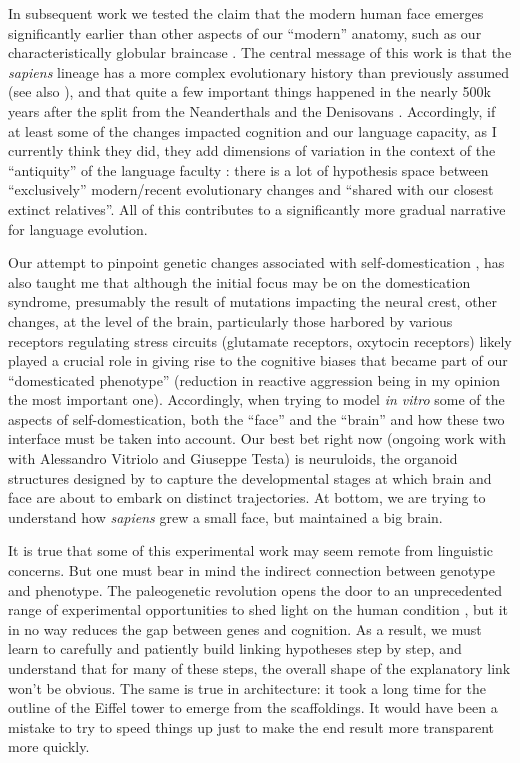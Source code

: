 In subsequent work \citep{andirko2021fine} we tested the claim that the modern human face emerges significantly earlier than other aspects of our ``modern'' anatomy, such as our characteristically globular braincase \citep{hublin2017new}. The central message of this work is that the \textit{sapiens} lineage has a more complex evolutionary history than previously assumed (see also \cite{scerri2018did,Bergstrom}), and that quite a few important things happened in the nearly 500k years after the split from the Neanderthals and the Denisovans \citep{stringer2016origin}. Accordingly, if at least some of the changes impacted cognition and our language capacity, as I currently think they did, they add dimensions of variation in the context of the ``antiquity'' of the language faculty \citep{dediu2013antiquity}: there is a lot of hypothesis space between ``exclusively'' modern/recent evolutionary changes and ``shared with our closest extinct relatives''. All of this contributes to a significantly more gradual narrative for language evolution.

Our attempt to pinpoint genetic changes associated with self-domestication \citep{theofanopoulou2017self}, has also taught me that although the initial focus may be on the domestication syndrome,
presumably the result of mutations impacting the neural crest, other changes, at the level of the brain, particularly those harbored by various receptors regulating stress circuits (glutamate receptors, oxytocin receptors) likely played a crucial role \citep{o2020glutamate,theofanopoulou2017hypothesis} in giving rise to the cognitive biases that became part of our ``domesticated phenotype'' (reduction in reactive aggression being in my opinion the most important one). Accordingly, when trying to model \textit{in vitro} some of the aspects of self-domestication, both the ``face'' and the ``brain'' and how these two interface must be taken into account. Our best bet right now (ongoing work with with Alessandro Vitriolo and Giuseppe Testa) is neuruloids, the organoid structures designed by \cite{haremaki2019self} to capture the developmental stages at which brain and face are about to embark on distinct trajectories. At bottom, we are trying to understand how \textit{sapiens} grew a small face, but maintained a big brain.

It is true that some of this experimental work may seem remote from linguistic concerns. But one must bear in mind the indirect connection between genotype and phenotype. The paleogenetic revolution opens the door to an unprecedented range of experimental opportunities to shed light on the human condition \citep{paabo2014human}, but it in no way reduces the gap between genes and cognition. As a result, we must learn to carefully and patiently build linking hypotheses step by step, and understand that for many of these steps, the overall shape of the explanatory link won't be obvious. The same is true in architecture: it took a long time for the outline of the Eiffel tower to emerge from the scaffoldings. It would have been a mistake to try to speed things up just to make the end result more transparent more quickly.

